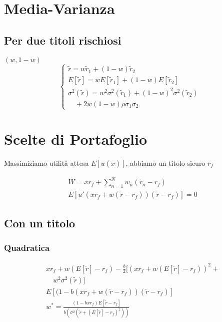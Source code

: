 \documentclass[a4paper,notitlepage]{report}%
\begin{document}
\begin{multicols*}{2}
\section*{Media-Varianza}

    \subsection*{Per due titoli rischiosi}
    $(w,1-w)$
    \[
        \left\{\begin{array}{l}
            \tilde{r}=w\tilde{r}_1+(1-w)\tilde{r}_2 \\
            E[\tilde{r}]=wE[\tilde{r}_1]+(1-w)E[\tilde{r}_2] \\
            \sigma^2(\tilde{r}) = w^2\sigma^2(\tilde{r}_1) + (1-w)^2\sigma^2(\tilde{r}_2)\\
            \quad +2w(1-w)\rho \sigma_1\sigma_2
        \end{array}\right.
    \]

\section*{Scelte di Portafoglio}

    Massimiziamo utilità attesa $E[u(\tilde{x})]$, abbiamo un titolo sicuro $r_f$

    \begin{align*}
        & \tilde{W} =  xr_f +\sum_{n=1}^N w_n (\tilde{r}_n-r_f) \\
        & E[u'(xr_f+w(\tilde{r}-r_f))(\tilde{r}-r_f)] = 0
    \end{align*}
    
    \subsection*{Con un titolo}

    \subsubsection*{Quadratica}
    \begin{align*}
        & xr_f+w(E[\tilde{r}]-r_f)-\frac{b}{2} [(xr_f+w(E[\tilde{r}]-r_f))^2+\\
        &\quad w^2\sigma^2(\tilde{r})] \\
        & E[(1-b(xr_f + w (\tilde{r}-r_f) ) (\tilde{r}-r_f)] \\
        & w^* = \frac{(1-bxr_f) E[\tilde{r}-r_f]}{ b (\sigma^2(\tilde{r} + (E[\tilde{r}]-r_f)^2))}
    \end{align*}


\end{multicols*}
\end{document}
